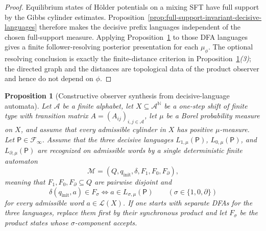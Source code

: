 \documentclass{etds}%
\numberwithin{equation}{section}
\theoremstyle{plain}
\newtheorem{proposition}[theorem]{Proposition}
\theoremstyle{definition}
\theoremstyle{remark}
\newcommand{\NN}{\mathbb{N}}
\begin{document}
\begin{proof}
Equilibrium states of H\"older potentials on a mixing SFT have full support by
the Gibbs cylinder estimates.  Proposition~\ref{prop:full-support-invariant-decisive-languages}
therefore makes the decisive prefix languages independent of the chosen
full-support measure.  Applying
Proposition~\ref{prop:automaton-regular-sufficient} to those DFA languages
gives a finite follower-resolving posterior presentation for each
$\mu_\phi$.  The optional resolving conclusion is exactly the finite-distance
criterion in Proposition~\ref{prop:automaton-regular-sufficient}\emph{(3)};
the directed graph and the distances are topological data of the product
observer and hence do not depend on $\phi$.
\end{proof}

\begin{proposition}[Constructive observer synthesis from decisive-language automata]
\label{prop:automaton-regular-sufficient}
Let $\mathcal{A}$ be a finite alphabet, let $X\subseteq\mathcal{A}^{\NN}$ be a
one-step shift of finite type with transition matrix
$A=(A_{ij})_{i,j\in\mathcal{A}}$, let $\mu$ be a Borel probability measure on
$X$, and assume that every admissible cylinder in $X$ has positive
$\mu$-measure.  Let $\mathsf{P}\in\mathcal{F}_\infty$.  Assume that the three
decisive languages
$L_{1,\mu}(\mathsf{P})$, $L_{0,\mu}(\mathsf{P})$, and
$L_{\partial,\mu}(\mathsf{P})$ are recognized on admissible words by a single
deterministic finite automaton
\[
\mathcal{M}=(Q,q_{\mathrm{init}},\delta,F_1,F_0,F_\partial),
\]
meaning that $F_1,F_0,F_\partial\subseteq Q$ are pairwise disjoint and
\[
\delta(q_{\mathrm{init}},a)\in F_\sigma
\Longleftrightarrow
a\in L_{\sigma,\mu}(\mathsf{P})
\qquad
(\sigma\in\{1,0,\partial\})
\]
for every admissible word $a\in\mathcal{L}(X)$.  If one starts with separate
DFAs for the three languages, replace them first by their synchronous product
\cite{HopcroftMotwaniUllman2001} and let $F_\sigma$ be the product states whose
$\sigma$-component accepts.


\end{proposition}
\end{document}
